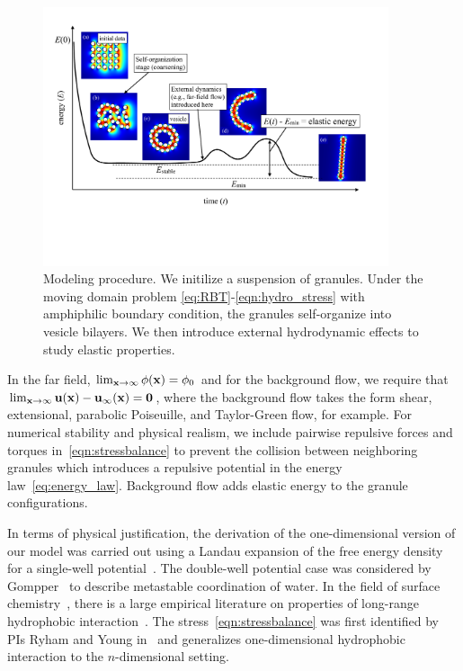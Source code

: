 \begin{figure} 
\includegraphics[width=4in]{figures/Background/coarsening.pdf}
\vspace{-20pt}
\caption{\label{fig:coarsening}
Modeling procedure.
We initilize a suspension of granules.
Under the moving domain problem
\eqref{eq:RBT}-\eqref{eqn:hydro_stress}
with amphiphilic boundary condition, the granules
self-organize into vesicle bilayers.
We then introduce external hydrodynamic effects to study elastic properties.
}
\vspace{5pt}
\end{figure}
In the far field, $\lim_{\mathbf{x} \to \infty} \phi(\mathbf{x}) = \phi_0$ and for the
background flow, we require that $\lim_{\mathbf{x} \to \infty} \mathbf{u}(\mathbf{x}) -
\mathbf{u}_{\infty}(\mathbf{x}) = \mathbf{0}$, where
the background flow takes the form
shear, extensional, parabolic Poiseuille, and
Taylor-Green flow, for example.
For numerical stability and physical realism, we
include pairwise repulsive forces and torques
in~\eqref{eqn:stressbalance} to prevent the collision between
neighboring granules which introduces a repulsive potential in the energy
law~\eqref{eq:energy_law}. Background flow adds elastic energy to the
granule configurations.

In terms of physical justification, the derivation of the
one-dimensional version of our model was carried out using a Landau
expansion of the free energy density for a single-well
potential~\cite{MaRa76, ErLjCl89}. The double-well potential case was
considered by Gompper~\cite{GoHaKo94} to describe metastable
coordination of water. In the field of surface
chemistry~\cite{Israelachvili1954}, there is a large empirical
literature on properties of long-range hydrophobic
interaction~\cite{LeRaPa77, KoNa15, Nagle17, Lum1999, Lin2005,
Meyer2006, Ducker2016, Jackson2016, Gletal88, Aketal17, Ch05}. The
stress~\eqref{eqn:stressbalance} was first identified by PIs Ryham and
Young in~\cite{Fu2018_SIAM} and generalizes one-dimensional hydrophobic
interaction to the $n$-dimensional setting. 

